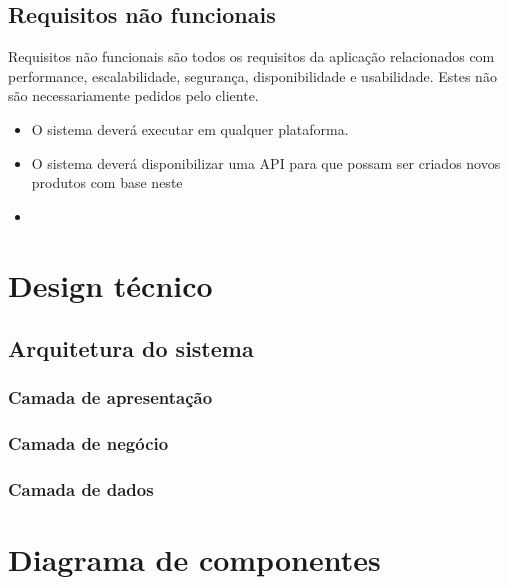 \subsection{Requisitos não funcionais}


Requisitos não funcionais são todos os requisitos da aplicação relacionados com
performance, escalabilidade, segurança, disponibilidade e usabilidade. Estes não são
necessariamente pedidos pelo cliente. 


\begin{itemize}
	\item O sistema deverá executar em qualquer plataforma.
	
	\item O sistema deverá disponibilizar uma API para que possam ser criados novos produtos com base neste 
	
	\item 
	
\end{itemize}







\section{Design técnico}



\subsection{Arquitetura do sistema}



\subsubsection{Camada de apresentação}


\subsubsection{Camada de negócio}



\subsubsection{Camada de dados}




\section{Diagrama de componentes}




